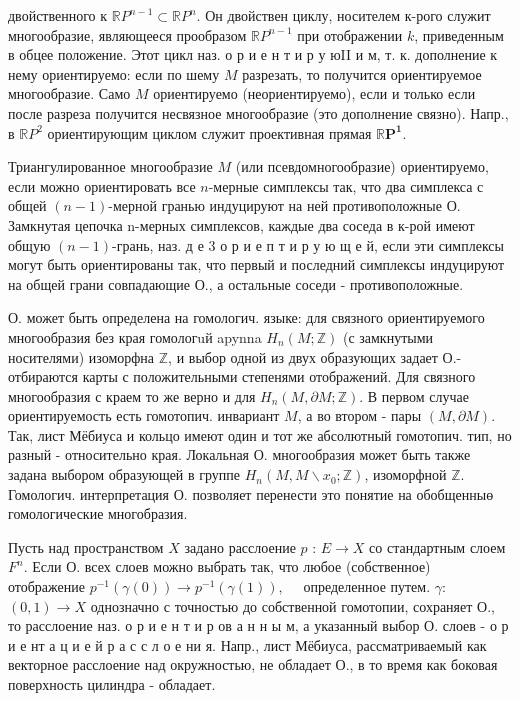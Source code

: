 \documentclass[10pt]{article}
\begin{document}
двойственного к $\mathbb{R} P^{n-1} \subset \mathbb{R} P^{n}$. Он двойствен циклу, носителем к-рого служит многообразие, являющееся прообразом $\mathbb{R} P^{n-1}$ при отображении $k$, приведенным в обцее положение. Этот цикл наз. о р и е н т и р у юII и м, т. к. дополнение к нему ориентируемо: если по шему $M$ разрезать, то получится ориентируемое многообразие. Само $M$ ориентируемо (неориентируемо), если и только если после разреза получится несвязное многообразие (это дополнение связно). Напр., в $\mathbb{R} P^{2}$ ориентирующим циклом служит проективная прямая $\mathbb{R} \boldsymbol{P}^{\mathbf{1}}$.

Триангулированное многообразие $M$ (или псевдомногообразие) ориентируемо, если можно ориентировать все $n$-мерные симплексы так, что два симплекса с общей $(n-1)$-мерной гранью индуцируют на ней противоположные О. Замкнутая цепочка n-мерных симплексов, каждые два соседа в к-рой имеют общую $(n-1)$-грань, наз. д е 3 о р и е п т и р у ю щ е й, если эти симплексы могут быть ориентированы так, что первый и последний симплексы индуцируют на общей грани совпадающие О., а остальные соседи - противоположные.

О. может быть определена на гомологич. языке: для связного ориентируемого многообразия без края гомологuй apynna $H_{n}(M ; \mathbb{Z})$ (с замкнутыми носителями) изоморфна $\mathbb{Z}$, и выбор одной из двух образующих задает О.- отбираются карты с положительными степенями отображений. Для связного многообразия с краем то же верно и для $H_{n}(M, \partial M ; \mathbb{Z})$. В первом случае ориентируемость есть гомотопич. инвариант $M$, а во втором - пары $(M, \partial M)$. Так, лист Мёбиуса и кольцо имеют один и тот же абсолютный гомотопич. тип, но разный - относительно края. Локальная О. многообразия может быть также задана выбором образующей в группе $H_{n}\left(M, M \backslash x_{0} ; \mathbb{Z}\right)$, изоморфной $\mathbb{Z}$. Гомологич. интерпретация $О$. позволяет перенести это понятие на обобщенныө гомологические многобразия.

Пусть над пространством $X$ задано расслоение $p$ : $E \rightarrow X$ со стандартным слоем $F^{n}$. Если О. всех слоев можно выбрать так, что любое (собственное) отображение $p^{-1}(\gamma(0)) \rightarrow p^{-1}(\gamma(1)), \quad$ определенное путем. $\gamma:$ $(0,1) \rightarrow X$ однозначно с точностью до собственной гомотопии, сохраняет О., то расслоение наз. о р и е н т и р ов а н н ы м, а указанный выбор О. слоев - о р и е нт а ц и е й р а с с л о е ни я. Напр., лист Мёбиуса, рассматриваемый как векторное расслоение над окружностью, не обладает О., в то время как боковая поверхность цилиндра - обладает.
\end{document}
